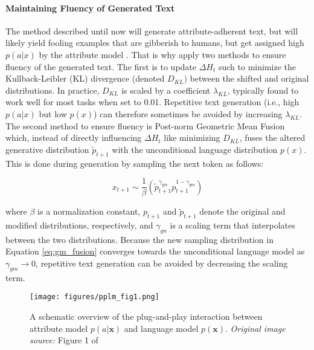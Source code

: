 \paragraph{Maintaining Fluency of Generated Text} The method described until now will generate attribute-adherent text, but will likely yield fooling examples \citep{nguyen2015deep} that are gibberish to humans, but get assigned high $p(a | x)$ by the attribute model \citep{dathathri2019plug}. That is why \cite{dathathri2019plug} apply two methods to ensure fluency of the generated text. The first is to update $\Delta H_t$ such to minimize the Kullback-Leibler (KL) divergence \citep{kullback1951information} (denoted $D_{KL})$ between the shifted and original distributions. In practice, $D_{KL}$ is scaled by a coefficient $\lambda_{KL}$, typically found to work well for most tasks when set to 0.01. Repetitive text generation (i.e., high $p(a | x)$ but low $p(x)$) can therefore sometimes be avoided by increasing $\lambda_{KL}$. The second method to ensure fluency is Post-norm Geometric Mean Fusion \citep{stahlberg-etal-2018-simple} which, instead of directly influencing $\Delta H_t$ like minimizing $D_{KL}$, fuses the altered generative distribution $\tilde{p}_{t + 1}$ with the unconditional language distribution $p(x)$. This is done during generation by sampling the next token as follows:

\begin{equation}
    x_{t + 1} \sim \frac{1}{\beta}
    \left( 
    \tilde{p}_{t + 1}^{\gamma_{gm}} p_{t + 1}^{1 - \gamma_{gm}}
    \right)
    \label{eq:gm_fusion}
\end{equation}

where $\beta$ is a normalization constant, $p_{t + 1}$ and $\tilde{p}_{t + 1}$ denote the original and modified distributions, respectively, and $\gamma_{gn}$ is a scaling term that interpolates between the two distributions. Because the new sampling distribution in Equation \ref{eq:gm_fusion} converges towards the unconditional language model as $\gamma_{gm} \rightarrow 0$, repetitive text generation can be avoided by decreasing the scaling term.


\begin{figure}[H]
    \centering
    \texttt{[image: figures/pplm\_fig1.png]}
    \caption{A schematic overview of the plug-and-play interaction between attribute model $p(a | \textbf{x})$ and language model $p(\textbf{x})$. \textit{Original image source:} Figure 1 of \cite{dathathri2019plug}}
    \label{fig:pplm_schematic_overview}
\end{figure}


